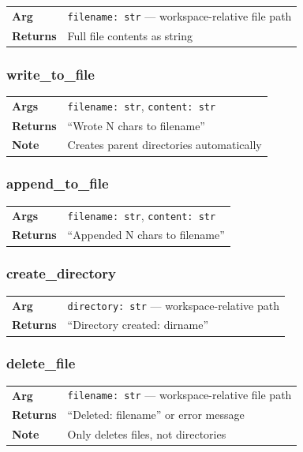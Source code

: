\documentclass[11pt,a4paper]{article}
\begin{document}
\begin{tabular}{@{}lp{10cm}@{}}
\textbf{Arg} & \texttt{filename: str} --- workspace-relative file path \\
\textbf{Returns} & Full file contents as string \\
\end{tabular}

\subsubsection{write\_to\_file}

\begin{tabular}{@{}lp{10cm}@{}}
\textbf{Args} & \texttt{filename: str}, \texttt{content: str} \\
\textbf{Returns} & ``Wrote N chars to filename'' \\
\textbf{Note} & Creates parent directories automatically \\
\end{tabular}

\subsubsection{append\_to\_file}

\begin{tabular}{@{}lp{10cm}@{}}
\textbf{Args} & \texttt{filename: str}, \texttt{content: str} \\
\textbf{Returns} & ``Appended N chars to filename'' \\
\end{tabular}

\subsubsection{create\_directory}

\begin{tabular}{@{}lp{10cm}@{}}
\textbf{Arg} & \texttt{directory: str} --- workspace-relative path \\
\textbf{Returns} & ``Directory created: dirname'' \\
\end{tabular}

\subsubsection{delete\_file}

\begin{tabular}{@{}lp{10cm}@{}}
\textbf{Arg} & \texttt{filename: str} --- workspace-relative file path \\
\textbf{Returns} & ``Deleted: filename'' or error message \\
\textbf{Note} & Only deletes files, not directories \\
\end{tabular}
\end{document}
